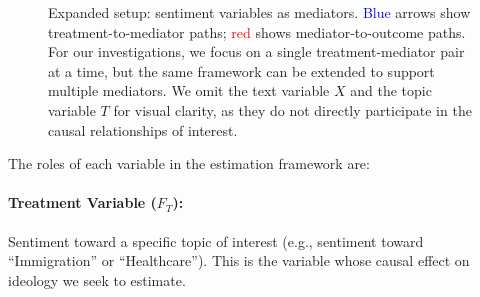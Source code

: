 \begin{figure}[h!]
  \centering
  \caption{Expanded setup: sentiment variables as mediators. \textcolor{blue}{Blue} arrows show treatment-to-mediator paths; \textcolor{red}{red} shows mediator-to-outcome paths. For our investigations, we focus on a single treatment-mediator pair at a time, but the same framework can be extended to support multiple mediators. We omit the text variable $X$ and the topic variable $T$ for visual clarity, as they do not directly participate in the causal relationships of interest.}
  \label{fig:causal3}
\end{figure}

The roles of each variable in the estimation framework are:

\paragraph{Treatment Variable ($F_T$):} Sentiment toward a specific topic of interest (e.g., sentiment toward ``Immigration'' or ``Healthcare''). This is the variable whose causal effect on ideology we seek to estimate.

